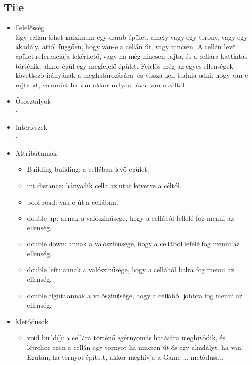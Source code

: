 \subsection{Tile}
\begin{itemize}
\item Felelősség\\
Egy cellán lehet maximum egy darab épület, amely vagy egy torony, vagy egy akadály, attól függően, hogy van-e a cellán út, vagy nincsen. A cellán levő épület referenciája lekérhető, vagy ha még nincsen rajta, és a cellára kattintás történik, akkor épül egy megfelelő épület. Felelős még az egyes ellenségek következő irányának a meghatározására, és vissza kell tudnia adni, hogy van-e rajta út, valamint ha van akkor milyen távol van a céltól.
\item Ősosztályok\\
-
\item Interfészek\\
-
\item Attribútumok\\
	\begin{itemize}
		\item Building building: a cellában levő epület.
		\item int distance: hányadik cella az utat követve a céltól.
		\item bool road: van-e út a cellában.
		\item double up: annak a valószinűsége, hogy a cellából felfelé fog menni az ellenség.
		\item double down: annak a valószinűsége, hogy a cellából lefelé fog menni az ellenség.
		\item double left: annak a valószinűsége, hogy a cellából balra fog menni az ellenség.
		\item double right: annak a valószinűsége, hogy a cellából jobbra fog menni az ellenség.
	\end{itemize}
\item Metódusok\\
	\begin{itemize}
		\item void build(): a cellára történő egérnyomás hatására meghívódik, és létrehoz ezen a cellán egy tornyot ha nincsen út és egy akadályt, ha van. Ezután, ha tornyot épített, akkor meghívja a Game ... metódusát.

\end{itemize}
\end{itemize}
